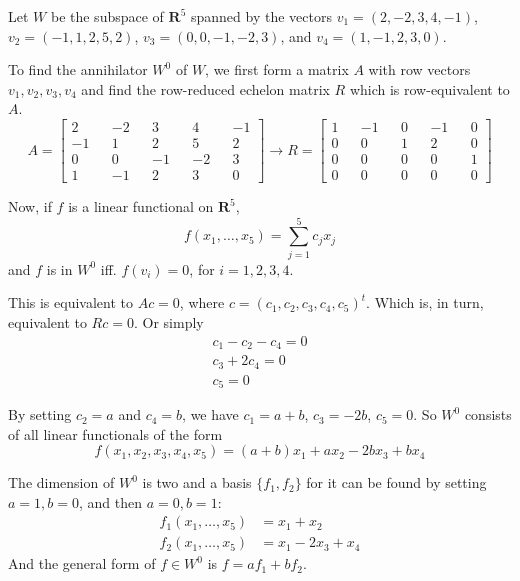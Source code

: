 \begin{example}
	Let $W$ be the subspace of $\textbf{R}^5$ spanned by the vectors $v_1 = (2, -2, 3, 4, -1)$, $v_2 = (-1, 1, 2, 5, 2)$, $v_3 = (0, 0, -1, -2, 3)$, and $v_4 = (1, -1, 2, 3, 0)$.

	To find the annihilator $W^0$ of $W$, we first form a matrix $A$ with row vectors $v_1, v_2, v_3, v_4$ and find the row-reduced echelon matrix $R$ which is row-equivalent to $A$.
	\[
		A = \begin{bmatrix}
			2 && -2 && 3 && 4 && -1 \\
			-1 && 1 && 2 && 5 && 2 \\
			0 && 0 && -1 && -2 && 3 \\
			1 && -1 && 2 && 3 && 0
		\end{bmatrix}
		\longrightarrow
		R = \begin{bmatrix}
			1 && -1 && 0 && -1 && 0 \\
			0 && 0 && 1 && 2 && 0 \\
			0 && 0 && 0 && 0 && 1 \\
			0 && 0 && 0 && 0 && 0
		\end{bmatrix}
	\]

	Now, if $f$ is a linear functional on $\textbf{R}^5$, 
	\[
		f(x_1, \ldots, x_5) = \sum_{j=1}^5 c_j x_j
	\]
	and $f$ is in $W^0$ iff. $f(v_i) = 0$, for $i = 1,2,3,4$.
	
	This is equivalent to $Ac = 0$, where $c = (c_1, c_2, c_3, c_4, c_5)^t$. Which is, in turn, equivalent to $Rc = 0$. Or simply
	\begin{equation*}
		\begin{aligned}
			c_1 - c_2 - c_4 = 0 \\
			c_3 + 2 c_4 = 0 \\
			c_5 = 0
		\end{aligned}
	\end{equation*}

	By setting $c_2 = a$ and $c_4 = b$, we have $c_1 = a+b$, $c_3 = -2b$, $c_5 = 0$. So $W^0$ consists of all linear functionals of the form
	\[
		f(x_1, x_2, x_3, x_4, x_5) = (a+b)x_1 + ax_2 - 2bx_3 + bx_4
	\]

	The dimension of $W^0$ is two and a basis $\{ f_1, f_2 \}$ for it can be found by setting $a = 1, b = 0$, and then $a = 0, b = 1$:
	\begin{equation*}
		\begin{aligned}
			f_1(x_1, \ldots, x_5) &= x_1 + x_2 \\
			f_2(x_1, \ldots, x_5) &= x_1 - 2x_3 + x_4
	\end{aligned}
\end{equation*}
	And the general form of $f \in W^0$ is $f = a f_1 + bf_2$.
\end{example}

